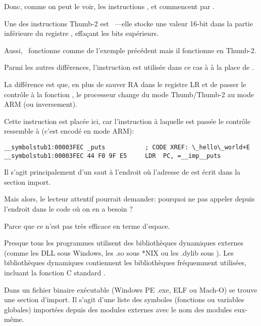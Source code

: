 
Donc, comme on peut le voir, les instructions ,  et 
commencent par .

Une des instructions Thumb-2 est  ~---elle stocke une valeur
16-bit dans la partie inférieure du registre , effaçant les bits supérieurs.

Aussi,  ~fonctionne comme  de l'exemple précédent
mais il fonctionne en Thumb-2.


Parmi les autres différences, l'instruction  est utilisée dans ce cas à
à la place de .

La différence est que, en plus de sauver \ac{RA} dans le registre \ac{LR} et de
passer le contrôle à la fonction \puts, le processeur change du mode Thumb/Thumb-2
au mode ARM (ou inversement).

Cette instruction est placée ici, car l'instruction à laquelle est passée le contrôle
ressemble à (c'est encodé en mode ARM):

\begin{lstlisting}[style=customasmARM]
__symbolstub1:00003FEC _puts           ; CODE XREF: \_hello\_world+E
__symbolstub1:00003FEC 44 F0 9F E5     LDR  PC, =__imp__puts
\end{lstlisting}

Il s'agit principalement d'un saut à l'endroit où l'adresse de \puts est écrit
dans la section import.

Mais alors, le lecteur attentif pourrait demander: pourquoi ne pas appeler \puts
depuis l'endroit dans le code où on en a besoin ?

Parce que ce n'est pas très efficace en terme d'espace.

Presque tous les programmes utilisent des bibliothèques dynamiques externes
(comme les DLL sous Windows, les .so sous *NIX ou les .dylib sous \MacOSX).
Les bibliothèques dynamiques contiennent les bibliothèques fréquemment utilisées,
incluant la fonction C standard \puts.

Dans un fichier binaire exécutable (Windows PE .exe, ELF ou Mach-O) se trouve
une section d'import.
Il s'agit d'une liste des symboles (fonctions ou variables globales) importées
depuis des modules externes avec le nom des modules eux-même.

